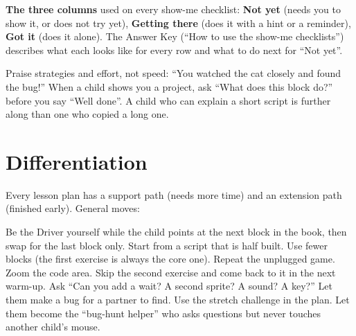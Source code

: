 \documentclass[track=junior,level=1,teacher]{kidscode}
\begin{document}
\textbf{The three columns} used on every show-me checklist:
\textbf{Not yet} (needs you to show it, or does not try yet),
\textbf{Getting there} (does it with a hint or a reminder),
\textbf{Got it} (does it alone). The Answer Key (\enquote{How to use the show-me checklists})
describes what each looks like for every row and what to do next for \enquote{Not yet}.

\begin{tip}
Praise strategies and effort, not speed: \enquote{You watched the cat closely and found the bug!}
When a child shows you a project, ask \enquote{What does this block do?} before you say
\enquote{Well done}. A child who can explain a short script is further along than one who copied a long one.
\end{tip}

\section{Differentiation}
Every lesson plan has a support path (needs more time) and an extension path (finished early).
General moves:

\begin{differentiation}
\supportpath Be the Driver yourself while the child points at the next block in the book, then
swap for the last block only. Start from a script that is half built. Use fewer blocks (the first
exercise is always the core one). Repeat the unplugged game. Zoom the code area. Skip the second
exercise and come back to it in the next warm-up.
\extensionpath Ask \enquote{Can you add a wait? A second sprite? A sound? A key?} Let them make
a bug for a partner to find. Use the stretch challenge in the plan. Let them become the
\enquote{bug-hunt helper} who asks questions but never touches another child's mouse.
\end{differentiation}
\end{document}
